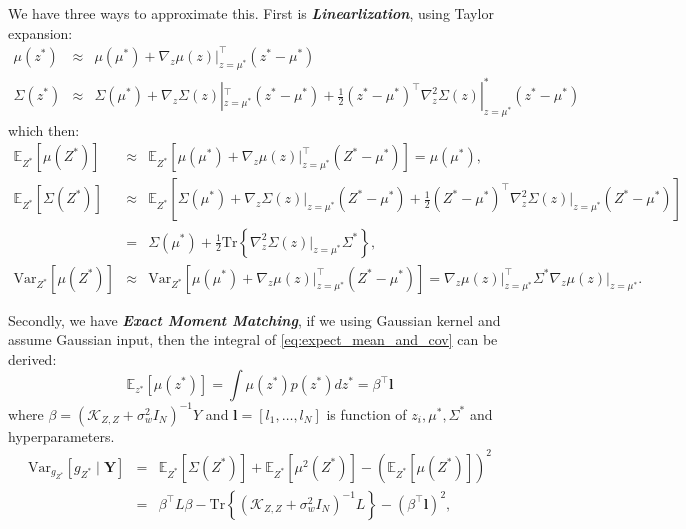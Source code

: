 \documentclass[10pt]{elegantbook}
\newcommand{\mydefination}[1]{\textbf{\textit{\textcolor{structurecolor}{#1}}}}
\begin{document}
We have three ways to approximate this. First is \mydefination{Linearlization}, using Taylor expansion:
\begin{equation}
    \begin{array}{lll}
        \mu(z^{\ast}) & \approx & \mu(\mu^{\ast})+\nabla_{z}\mu(z)|_{z=\mu^{\ast}}^{\top}(z^{\ast}-\mu^{\ast})
        \\ \Sigma(z^{\ast}) & \approx & \Sigma(\mu^{\ast})+\nabla_{z}\Sigma(z)|_{z=\mu^{\ast}}^{\top}(z^{\ast}-\mu^{\ast}) + 
        \frac{1}{2}(z^{\ast}-\mu^{\ast})^{\top}\nabla_{z}^{2}\Sigma(z)|_{z=\mu^{\ast}}^{\ast}(z^{\ast}-\mu^{\ast})
    \end{array}
\end{equation}
which then:
\begin{equation}
\begin{array}{lll}
\mathbb{E}_{Z^*}[\mu(Z^*)] &\approx& \mathbb{E}_{Z^*}[\mu(\mu^*) + \nabla_z \mu(z)\big|_{z = \mu^*}^{\top} (Z^* - \mu^*)] 
= \mu(\mu^*), \\
\mathbb{E}_{Z^*}[\Sigma(Z^*)] &\approx& \mathbb{E}_{Z^*}[\Sigma(\mu^*) + \nabla_z \Sigma(z)\big|_{z = \mu^*} (Z^* - \mu^*) + \frac{1}{2} (Z^* - \mu^*)^\top \nabla_z^2 \Sigma(z)\big|_{z = \mu^*} (Z^* - \mu^*)] \\
&=& \Sigma(\mu^*) + \frac{1}{2} \mathrm{Tr}\left\{\nabla_z^2 \Sigma(z)\big|_{z = \mu^*} \Sigma^*\right\}, \\
\mathrm{Var}_{Z^*}[\mu(Z^*)] &\approx& \mathrm{Var}_{Z^*}[\mu(\mu^*) + \nabla_z \mu(z)\big|_{z = \mu^*}^{\top} (Z^* - \mu^*)] 
= \nabla_z \mu(z)\big|_{z = \mu^*}^{\top} \Sigma^* \nabla_z \mu(z)\big|_{z = \mu^*}.
\end{array}
\end{equation}

Secondly, we have \mydefination{Exact Moment Matching}, if we using Gaussian kernel and assume Gaussian input, then the 
integral of \ref{eq:expect_mean_and_cov} can be derived:
\[
\mathbb{E}_{z^{*}}[\mu(z^{*})]=\int\mu(z^{*})p(z^{*})d z^{*} = \beta^{\top} \mathbf l
\]
where $\beta = (\mathscr{K}_{Z, Z} + \sigma_w^2 I_N)^{-1} Y$ and $\mathbf l = [l_1, \ldots, l_N]$ is function of $z_i, \mu^*
, \Sigma^*$ and hyperparameters.
\[
\begin{array}{lll}
    \text{Var}_{g_{Z^*}}[g_{Z^*} \mid \mathbf{Y}] 
    &=& \mathbb{E}_{Z^*}[\Sigma(Z^*)] + \mathbb{E}_{Z^*}[\mu^2(Z^*)] - \left( \mathbb{E}_{Z^*}[\mu(Z^*)] \right)^2 \\
    &=& \beta^\top L \beta - \mathrm{Tr} \left\{ \left( \mathscr{K}_{Z,Z} + \sigma_w^2 I_N \right)^{-1} L \right\} - \left( \beta^\top \mathbf{l} \right)^2,
\end{array}
\]
\end{document}
